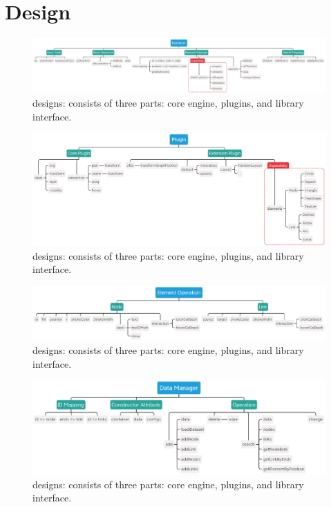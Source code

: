 \section{\name Design}
\begin{figure}[htbp]
    \includegraphics[width=\linewidth]{fig/xmind-01.eps}
    \caption{
        \name designs: \name consists of three parts: core engine, plugins, and library interface.
    }
    \label{fig:design}
\end{figure}

\begin{figure}[htbp]
    \includegraphics[width=\linewidth]{fig/xmind-02.eps}
    \caption{
        \name designs: \name consists of three parts: core engine, plugins, and library interface.
    }
    \label{fig:design}
\end{figure}
\begin{figure}[htbp]
    \includegraphics[width=\linewidth]{fig/xmind-03.eps}
    \caption{
        \name designs: \name consists of three parts: core engine, plugins, and library interface.
    }
    \label{fig:design}
\end{figure}
\begin{figure}[htbp]
    \includegraphics[width=\linewidth]{fig/xmind-04.eps}
    \caption{
        \name designs: \name consists of three parts: core engine, plugins, and library interface.
    }
    \label{fig:design}
\end{figure}


